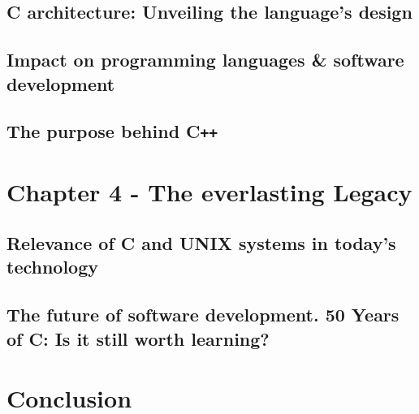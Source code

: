 \documentclass[12pt]{article}
\begin{document}
\subsection{C architecture: Unveiling the language's design}

\newpage
\subsection{Impact on programming languages \& software development}

\newpage
\subsection{The purpose behind C\texttt{++}}

\newpage
\section{Chapter 4 - The everlasting Legacy}
\subsection{Relevance of C and UNIX systems in today's technology}

\newpage
\subsection{The future of software development. 50 Years of C: Is it still worth learning?}

\newpage
\section{Conclusion}
\end{document}
